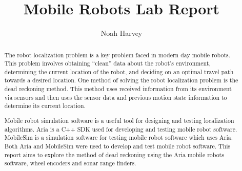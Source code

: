 \documentclass[a4paper,titlepage]{article}
\begin{document}
	\title{Mobile Robots Lab Report}
	\author{Noah Harvey}
	\maketitle

	\begin{abstract}

	The robot localization problem is a key problem faced in modern day mobile
	robots. This problem involves obtaining ``clean'' data about the robot's
	environment, determining the current location of the robot, and deciding on an
	optimal travel path towards a desired location. One method of solving the
	robot localization problem is the dead reckoning method. This method uses
	received information from its environment via sensors and then uses the sensor
	data and previous motion state information to determine its current location. 

	Mobile robot simulation software is a useful tool for designing and testing
	localization algorithms. Aria is a C++ SDK used for developing and testing
	mobile robot software. MobileSim is a simulation software for testing mobile
	robot software which uses Aria. Both Aria and MobileSim were used to develop
	and test mobile robot software. This report aims to explore the method of dead
	reckoning using the Aria mobile robots software, wheel encoders and sonar
	range finders. 
	
	\end{abstract}

	\tableofcontents
	\listoftables
	\listoffigures

	\pagebreak
	
	
	\pagebreak
	
\end{document}
